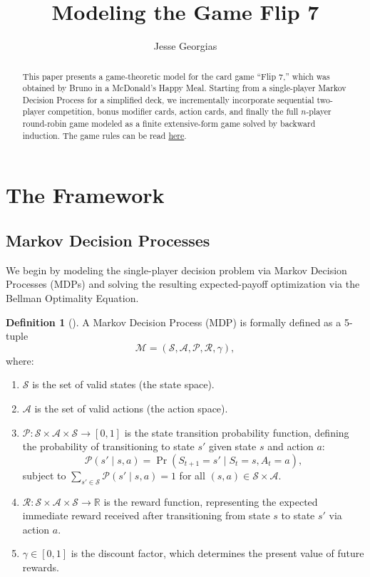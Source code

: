 \documentclass{article}
\title{Modeling the Game Flip 7}
\author{Jesse Georgias}
\theoremstyle{plain}
\theoremstyle{definition}
\newtheorem{defi}{Definition}[section]
\theoremstyle{remark}
\begin{document}
\maketitle

\begin{abstract}
This paper presents a game-theoretic model for the card game ``Flip 7,'' which was obtained by Bruno in a McDonald's Happy Meal. Starting from a single-player Markov Decision Process for a simplified deck, we incrementally incorporate sequential two-player competition, bonus modifier cards, action cards, and finally the full $n$-player round-robin game modeled as a finite extensive-form game solved by backward induction.
The game rules can be read \href{https://www.youtube.com/watch?v=dQw4w9WgXcQ}{here}.
\end{abstract}

\section{The Framework}

\subsection{Markov Decision Processes}
We begin by modeling the single-player decision problem via Markov Decision Processes (MDPs) and solving the resulting expected-payoff optimization via the Bellman Optimality Equation.

\begin{defi}[\cite{sutton2018reinforcement}]
A Markov Decision Process (MDP) is formally defined as a 5-tuple
\[
    \mathcal{M} = (\mathcal{S}, \mathcal{A}, \mathcal{P}, \mathcal{R}, \gamma),
\]
where:
\begin{enumerate}
    \item $\mathcal{S}$ is the set of valid states (the state space).
    \item $\mathcal{A}$ is the set of valid actions (the action space).
    \item $\mathcal{P}: \mathcal{S} \times \mathcal{A} \times \mathcal{S} \to [0, 1]$ is the state transition probability function, defining the probability of transitioning to state $s'$ given state $s$ and action $a$:
    \[
        \mathcal{P}(s' \mid s, a) = \Pr(S_{t+1} = s' \mid S_t = s, A_t = a),
    \]
    subject to $\sum_{s' \in \mathcal{S}} \mathcal{P}(s' \mid s, a) = 1$ for all $(s, a) \in \mathcal{S} \times \mathcal{A}$.
    \item $\mathcal{R}: \mathcal{S} \times \mathcal{A} \times \mathcal{S} \to \mathbb{R}$ is the reward function, representing the expected immediate reward received after transitioning from state $s$ to state $s'$ via action $a$.
    \item $\gamma \in [0, 1]$ is the discount factor, which determines the present value of future rewards.
\end{enumerate}
\end{defi}
\end{document}
